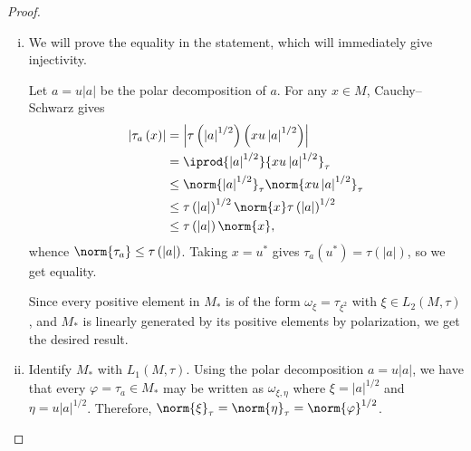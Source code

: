 \documentclass[10pt]{mypackage}
\begin{document}
\begin{proof}\hfill
  \begin{enumerate}[(i)]
    \item We will prove the equality in the statement, which will immediately give injectivity.

      Let $a = u\left\vert a \right\vert$ be the polar decomposition of $a$. For any $x\in M$, Cauchy--Schwarz gives
      \begin{align*}
        \left\vert \tau_a\left( x \right) \right\vert &= \left\vert \tau\left( \left\vert a \right\vert^{1/2} \right)\left( xu\left\vert a \right\vert^{1/2} \right) \right\vert\\
                                                      &= \iprod{\left\vert a \right\vert^{1/2}}{xu\left\vert a \right\vert^{1/2}}_{\tau}\\
                                                      &\leq \norm{\left\vert a \right\vert^{1/2}}_{\tau}\norm{xu\left\vert a \right\vert^{1/2}}_{\tau}\\
                                                      &\leq \tau\left( \left\vert a \right\vert \right)^{1/2}\norm{x}\tau\left( \left\vert a \right\vert \right)^{1/2}\\
                                                      &\leq \tau\left( \left\vert a \right\vert \right)\norm{x},
      \end{align*}
      whence $\norm{\tau_a} \leq \tau\left( \left\vert a \right\vert \right)$. Taking $x = u^{\ast}$ gives $\tau_a\left( u^{\ast} \right) = \tau\left( \left\vert a \right\vert \right)$, so we get equality.

      Since every positive element in $M_{\ast}$ is of the form $\omega_{\xi} = \tau_{\xi^2}$ with $\xi\in L_2\left( M,\tau \right)$, and $M_{\ast}$ is linearly generated by its positive elements by polarization, we get the desired result.
    \item Identify $M_{\ast}$ with $L_1\left( M,\tau \right)$. Using the polar decomposition $a = u\left\vert a \right\vert$, we have that every $\varphi = \tau_a\in M_{\ast}$ may be written as $\omega_{\xi,\eta}$ where $\xi = \left\vert a \right\vert^{1/2}$ and $\eta = u\left\vert a \right\vert^{1/2}$. Therefore, $\norm{\xi}_{\tau} = \norm{\eta}_{\tau} = \norm{\varphi}^{1/2}$.


\end{enumerate}
\end{proof}
\end{document}

